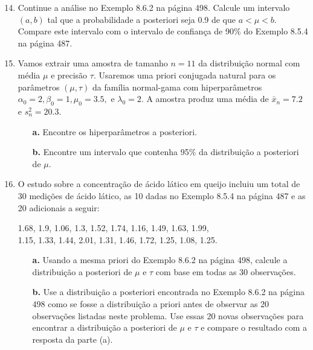 \begin{enumerate}
    \setcounter{enumi}{13} %
    \item Continue a análise no Exemplo 8.6.2 na página 498. Calcule um intervalo $(a, b)$ tal que a probabilidade a posteriori seja 0.9 de que $a < \mu < b$. Compare este intervalo com o intervalo de confiança de 90\% do Exemplo 8.5.4 na página 487.

    \item Vamos extrair uma amostra de tamanho $n=11$ da distribuição normal com média $\mu$ e precisão $\tau$. Usaremos uma priori conjugada natural para os parâmetros $(\mu, \tau)$ da família normal-gama com hiperparâmetros $\alpha_0 = 2, \beta_0 = 1, \mu_0 = 3.5,$ e $\lambda_0 = 2$. A amostra produz uma média de $\bar{x}_n = 7.2$ e $s_n^2 = 20.3$.
    \begin{enumerate}
        \item[\textbf{a.}] Encontre os hiperparâmetros a posteriori.
        \item[\textbf{b.}] Encontre um intervalo que contenha 95\% da distribuição a posteriori de $\mu$.
    \end{enumerate}

    \item O estudo sobre a concentração de ácido lático em queijo incluiu um total de 30 medições de ácido lático, as 10 dadas no Exemplo 8.5.4 na página 487 e as 20 adicionais a seguir:
    \begin{center}
        1.68, 1.9, 1.06, 1.3, 1.52, 1.74, 1.16, 1.49, 1.63, 1.99, \\
        1.15, 1.33, 1.44, 2.01, 1.31, 1.46, 1.72, 1.25, 1.08, 1.25.
    \end{center}
    \begin{enumerate}
        \item[\textbf{a.}] Usando a mesma priori do Exemplo 8.6.2 na página 498, calcule a distribuição a posteriori de $\mu$ e $\tau$ com base em todas as 30 observações.
        \item[\textbf{b.}] Use a distribuição a posteriori encontrada no Exemplo 8.6.2 na página 498 como se fosse a distribuição a priori antes de observar as 20 observações listadas neste problema. Use essas 20 novas observações para encontrar a distribuição a posteriori de $\mu$ e $\tau$ e compare o resultado com a resposta da parte (a).
    \end{enumerate}

\end{enumerate}